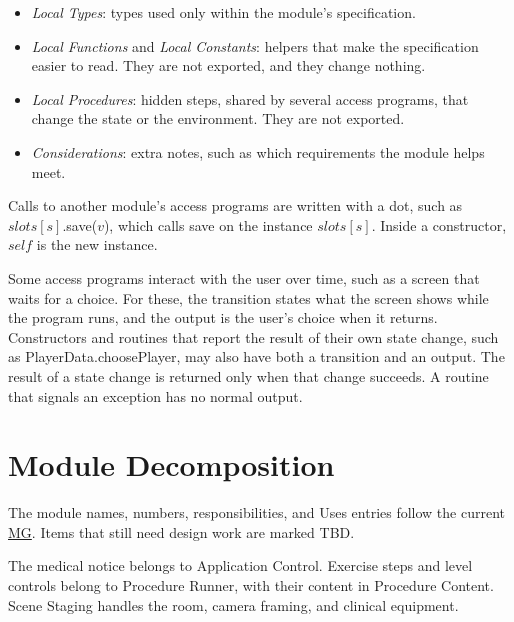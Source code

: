 \documentclass[10pt, titlepage]{article}
\newcommand{\mgurl}{https://github.com/team-hindsight/ophthamology-game/blob/main/pdfs/Design/SoftArchitecture/MG.pdf}
\newcommand{\mg}{\href{\mgurl}{MG}}
\newcommand{\T}[1]{\mathit{#1}}          %
\newcommand{\out}{\mathit{out}}
\newcommand{\exc}{\mathit{exc}}
\begin{document}
\begin{itemize}
\begin{itemize}
    as $\out := \ldots$, and \textbf{exception} gives the error as $\exc :=
    \ldots$, or ``none''. Exception conditions are checked before the
    transition. When an exception is signalled, nothing changes.
  \item \emph{Local Types}: types used only within the module's specification.
  \item \emph{Local Functions} and \emph{Local Constants}: helpers that make the
    specification easier to read. They are not exported, and they change
    nothing.
  \item \emph{Local Procedures}: hidden steps, shared by several access
    programs, that change the state or the environment. They are not
    exported.
  \item \emph{Considerations}: extra notes, such as which requirements the
    module helps meet.
  \end{itemize}
\end{itemize}

Calls to another module's access programs are written with a dot, such as
$\T{slots}[s]$.save($v$), which calls save on the instance $\T{slots}[s]$.
Inside a constructor, $\T{self}$ is the new instance.

Some access programs interact with the user over time, such as a screen that
waits for a choice. For these, the transition states what the screen shows
while the program runs, and the output is the user's choice when it returns.
Constructors and routines that report the result of their own state change,
such as PlayerData.choosePlayer, may also have both a transition and an
output. The result of a state change is returned only when that change
succeeds. A routine that signals an exception has no normal output.

\newpage
\section{Module Decomposition}

The module names, numbers, responsibilities, and Uses entries follow the
current \mg{}. Items that still need design work are marked TBD.

The medical notice belongs to Application Control. Exercise steps and level
controls belong to Procedure Runner, with their content in Procedure Content.
Scene Staging handles the room, camera framing, and clinical equipment.
\end{document}
